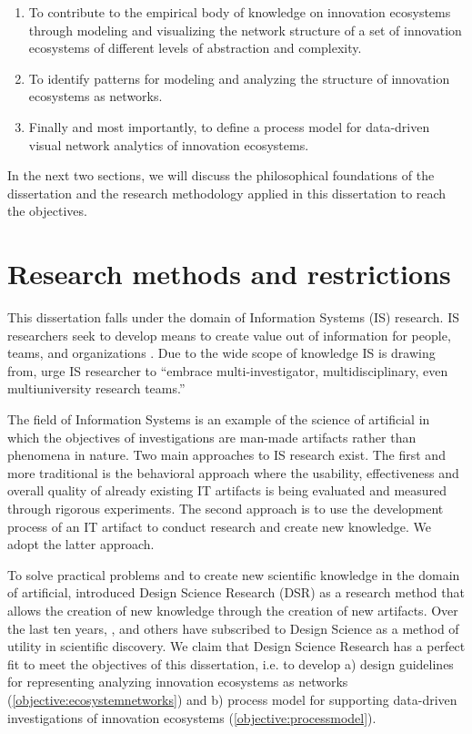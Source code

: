 \begin{enumerate}[label=\textbf{Objective \Roman*},align=left]
	\item To contribute to the empirical body of knowledge on innovation ecosystems through modeling and visualizing the network structure of a set of innovation ecosystems of different levels of abstraction and complexity.
    \label{objective:empirical}
	\item To identify patterns for modeling and analyzing the structure of innovation ecosystems as networks.
    \label{objective:ecosystemnetworks}
	\item Finally and most importantly, to define a process model for data-driven visual network analytics of innovation ecosystems.
     \label{objective:processmodel}
\end{enumerate}

In the next two sections, we will discuss the philosophical foundations of the dissertation and the research methodology applied in this dissertation to reach the objectives.

\section{Research methods and restrictions}
\label{sec:methods}

This dissertation falls under the domain of Information Systems (IS) research. IS researchers seek to develop means to create value out of information for people, teams, and organizations \citep{Nunamaker2011TowardSystems}. Due to the wide scope of knowledge IS is drawing from, \cite{Nunamaker2011TowardSystems} urge IS researcher to ``embrace multi-investigator, multidisciplinary, even multiuniversity research teams.''

The field of Information Systems is an example of the science of artificial \citep{Simon1969} in which the objectives of investigations are man-made artifacts rather than phenomena in nature. Two main approaches to IS research exist. The first and more traditional is the behavioral approach where the usability, effectiveness and overall quality of already existing IT artifacts is being evaluated and measured through rigorous experiments. The second approach is to use the development process of an IT artifact to conduct research and create new knowledge. We adopt the latter approach.

To solve practical problems and to create new scientific knowledge in the domain of artificial, \citep{Hevner2004} introduced Design Science Research (DSR) as a research method that allows the creation of new knowledge through the creation of new artifacts. Over the last ten years, \cite{Vaishnavi2007}, \cite{Peffers2007} and others have subscribed to Design Science as a method of utility in scientific discovery. We claim that Design Science Research has a perfect fit to meet the objectives of this dissertation, i.e. to develop a) design guidelines for representing analyzing innovation ecosystems as networks (\ref{objective:ecosystemnetworks}) and b) process model for supporting data-driven investigations of innovation ecosystems (\ref{objective:processmodel}).

